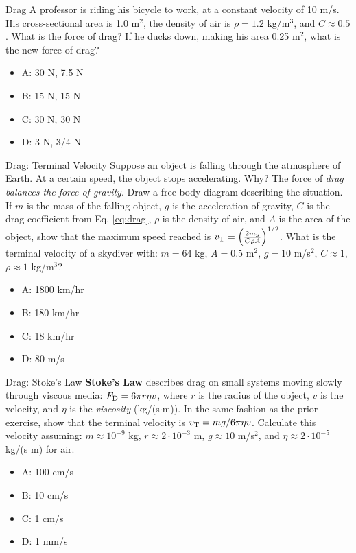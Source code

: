 \documentclass{beamer}
\begin{document}
\begin{frame}{Drag}
A professor is riding his bicycle to work, at a constant velocity of 10 m/s.  His cross-sectional area is 1.0 m$^2$, the density of air is $\rho = 1.2$ kg/m$^3$, and $C \approx 0.5$.  What is the force of drag?  If he ducks down, making his area 0.25 m$^2$, what is the new force of drag?
\begin{itemize}
\item A: 30 N, 7.5 N
\item B: 15 N, 15 N
\item C: 30 N, 30 N
\item D: 3 N, 3/4 N
\end{itemize}
\end{frame}

\begin{frame}{Drag: Terminal Velocity}
\small
Suppose an object is falling through the atmosphere of Earth.  At a certain speed, the object stops accelerating.  Why?  The force of \textit{drag balances the force of gravity}.  Draw a free-body diagram describing the situation.  If $m$ is the mass of the falling object, $g$ is the acceleration of gravity, $C$ is the drag coefficient from Eq. \ref{eq:drag}, $\rho$ is the density of air, and $A$ is the area of the object, show that the maximum speed reached is $v_{\rm T} = \left(\frac{2mg}{C\rho A}\right)^{1/2}$.  What is the terminal velocity of a skydiver with: $m = 64$ kg, $A = 0.5$ m$^2$, $g = 10$ m/s$^2$, $C \approx 1$, $\rho \approx 1$ kg/m$^3$?
\begin{itemize}
\item A: 1800 km/hr
\item B: 180 km/hr
\item C: 18 km/hr
\item D: 80 m/s
\end{itemize}
\end{frame}

\begin{frame}{Drag: Stoke's Law}
\small
\alert{\textbf{Stoke's Law}} describes drag on small systems moving slowly through viscous media: $F_{\rm D} = 6\pi r\eta v$, where $r$ is the radius of the object, $v$ is the velocity, and $\eta$ is the \textit{viscosity} (kg/(s$\cdot$m)).  In the same fashion as the prior exercise, show that the terminal velocity is $v_{\rm T} = mg/6\pi\eta v$.  Calculate this velocity assuming: $m\approx 10^{-9}$ kg, $r\approx 2 \cdot 10^{-3}$ m, $g\approx 10$ m/s$^2$, and $\eta \approx 2 \cdot 10^{-5}$ kg/(s m) for air.
\begin{itemize}
\item A: 100 cm/s
\item B: 10 cm/s
\item C: 1 cm/s
\item D: 1 mm/s
\end{itemize}
\end{frame}
\end{document}
